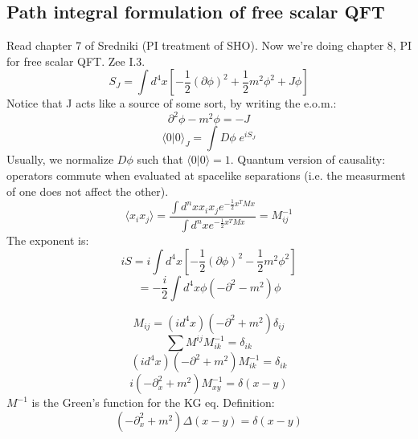 \documentclass[12 pt]{article}
\begin{document}
\subsection*{Path integral formulation of free scalar QFT}
Read chapter 7 of Sredniki (PI treatment of SHO). Now we're doing chapter 8, PI for free scalar QFT. Zee I.3.
\[  S_J = \int d^4 x \left[  -\frac{1}{2} (\partial \phi)^2 + \frac{1}{2} m^2 \phi^2 + J \phi \right]  \]
Notice that J acts like a source of some sort, by writing the e.o.m.:
\[  \partial^2 \phi - m^2 \phi = -J  \]
\[  \langle 0|0\rangle_J = \int D\phi\; e^{iS_J}  \]
Usually, we normalize $D\phi$ such that $\langle 0|0\rangle = 1$. Quantum version of causality: operators commute when evaluated at spacelike separations (i.e. the measurment of one does not affect the other).
\[ \langle x_i x_j\rangle = \frac{\int d^n x x_i x_j e^{-\frac{1}{2}x^T M x}}{\int d^n x e^{-\frac{1}{2}x^T M x}} = M^{-1}_{ij} \]
The exponent is: 
\[  iS = i \int d^4 x \left[  -\frac{1}{2} (\partial \phi)^2 -\frac{1}{2} m^2 \phi^2 \right]  \]
\[  = -\frac{i}{2} \int d^4 x \phi (-\partial^2 - m^2) \phi  \]

\[ M_{ij} = (id^4 x) ( - \partial^2 + m^2) \delta_{ij}  \]
\[  \sum M^{ij} M^{-1}_{ik} = \delta_{ik} \]
\[ (i d^4 x) (-\partial^2 + m^2) M^{-1}_{ik} = \delta_{ik}  \]
\[  i (-\partial_x^2 + m^2) M^{-1}_{xy} = \delta(x-y) \]
$M^{-1}$ is the Green's function for the KG eq. Definition:
\[   (-\partial_x^2 + m^2) \Delta (x-y) = \delta(x-y)  \]
\end{document}
